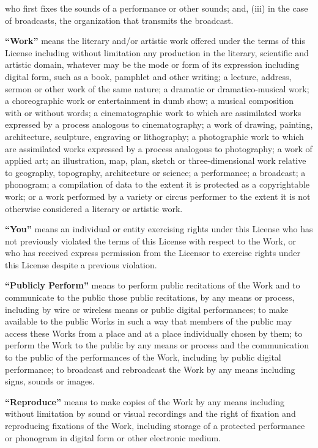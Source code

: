 \begin{doclicense@enumerate}
who first fixes the sounds of a performance or other
sounds; and, (iii) in the case of broadcasts, the
organization that transmits the broadcast.
\item \textbf{``Work''} means the literary and/or
artistic work offered under the terms of this License
including without limitation any production in the
literary, scientific and artistic domain, whatever may be
the mode or form of its expression including digital
form, such as a book, pamphlet and other writing; a
lecture, address, sermon or other work of the same
nature; a dramatic or dramatico-musical work; a
choreographic work or entertainment in dumb show; a
musical composition with or without words; a
cinematographic work to which are assimilated works
expressed by a process analogous to cinematography; a
work of drawing, painting, architecture, sculpture,
engraving or lithography; a photographic work to which
are assimilated works expressed by a process analogous to
photography; a work of applied art; an illustration, map,
plan, sketch or three-dimensional work relative to
geography, topography, architecture or science; a
performance; a broadcast; a phonogram; a compilation of
data to the extent it is protected as a copyrightable
work; or a work performed by a variety or circus
performer to the extent it is not otherwise considered a
literary or artistic work.
\item \textbf{``You''} means an individual or entity
exercising rights under this License who has not
previously violated the terms of this License with
respect to the Work, or who has received express
permission from the Licensor to exercise rights under
this License despite a previous violation.
\item \textbf{``Publicly Perform''} means to perform
public recitations of the Work and to communicate to the
public those public recitations, by any means or process,
including by wire or wireless means or public digital
performances; to make available to the public Works in
such a way that members of the public may access these
Works from a place and at a place individually chosen by
them; to perform the Work to the public by any means or
process and the communication to the public of the
performances of the Work, including by public digital
performance; to broadcast and rebroadcast the Work by any
means including signs, sounds or images.
\item \textbf{``Reproduce''} means to make copies of
the Work by any means including without limitation by
sound or visual recordings and the right of fixation and
reproducing fixations of the Work, including storage of a
protected performance or phonogram in digital form or
other electronic medium.
\end{doclicense@enumerate}
